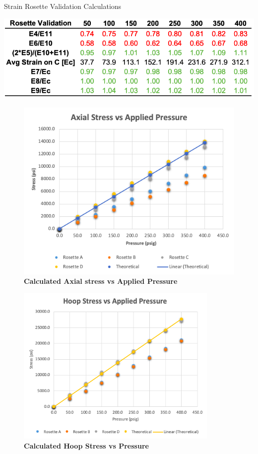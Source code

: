 \documentclass{article}
\begin{document}
\begin{table}[H]
  \caption{Strain Rosette Validation Calculations }
  \includegraphics[width=\linewidth]{table_rosette_ratios}
  \centering
\end{table}

\begin{figure} [H]
	\centering
	\includegraphics [width=.88\textwidth]{plot_axialvspressure}
	\caption{ \textbf{Calculated Axial stress vs Applied Pressure}}
\end{figure} 

\begin{figure} [H]
	\centering
	\includegraphics [width=0.87\textwidth]{plot_hoop_measured}
	\caption{ \textbf{Calculated Hoop Stress vs Pressure}}
\end{figure} 
\end{document}

